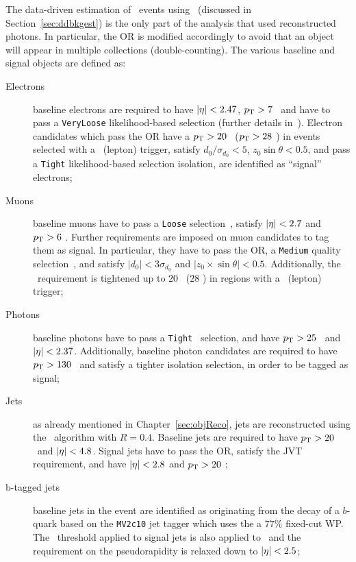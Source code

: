 		The data-driven estimation of \ttZ\ events using \ttgamma\ (discussed in Section~\ref{sec:ddbkgest}) is the only part of the analysis that used reconstructed photons. In particular, the \ac{OR} is modified accordingly to avoid that an object will appear in multiple collections (double-counting). The various baseline and signal objects are defined as:

		\begin{description}
			\item[Electrons] 
				baseline electrons are required to have $|\eta| < 2.47$, $p_{\mathrm{T}} > 7$ \GeV\ and have to pass a \texttt{VeryLoose} likelihood-based selection (further details in~\cite{egamma, egamma2}). Electron candidates which pass the \ac{OR} have a $p_{\mathrm{T}} > 20$ \gev\ ($p_{\mathrm{T}} > 28$ \GeV) in events selected with a \met\ (lepton) trigger, satisfy $d_0/\sigma_{d_{0}} < 5$, $z_0 \sin \theta < 0.5$, and pass a \texttt{Tight} likelihood-based selection isolation, are identified as ``signal'' electrons;

			\item[Muons] 	
				baseline muons have to pass a \texttt{Loose} selection~\cite{PERF-2015-10}, satisfy $|\eta| < 2.7$ and $p_{\mathrm{T}} > 6$ \GeV. Further requirements are imposed on muon candidates to tag them as signal. In particular, they have to pass the \ac{OR}, a \texttt{Medium} quality selection~\cite{PERF-2015-10}, and satisfy
				$|d_0|< 3 \sigma_{d_0}$ and $|z_0 \times \sin \theta |<0.5$. Additionally, the \pt\ requirement is tightened up to $20$ \gev\ ($28$ \GeV) in regions with a \met\ (lepton) trigger;

			\item[Photons]
				baseline photons have to pass a \texttt{Tight}~\cite{Aaboud:2016yuq} selection, and have $p_{\mathrm{T}} > 25$ \GeV\ and $|\eta| < 2.37$. Additionally, baseline photon candidates are required to have $p_{\mathrm{T}} > 130$ \GeV\ and satisfy a tighter isolation selection, in order to be tagged as signal;
			
			\item[Jets]
				as already mentioned in Chapter~\ref{sec:objReco}, jets are reconstructed using the \antikt\ algorithm with $R=0.4$. Baseline jets are required to have $p_{\mathrm{T}}>20$ \GeV\ and $|\eta|< 4.8$. Signal jets have to pass the \ac{OR}, satisfy the \ac{JVT} requirement, and have $|\eta| < 2.8$ and $p_{\mathrm{T}} > 20$ \GeV;

			\item[b-tagged jets]
				baseline jets in the event are identified as originating from the decay of a $b$-quark based on the \texttt{MV2c10} jet tagger which uses the a $77\%$ fixed-cut WP. The \pt\ threshold applied to signal jets is also applied to \bj\ and the requirement on the pseudorapidity is relaxed down to $|\eta| < 2.5$;
			

\end{description}
